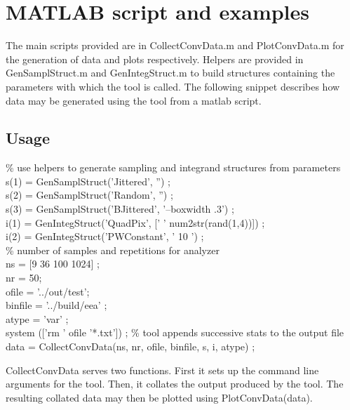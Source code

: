 \section{MATLAB script and examples}
\label{sec:matlab}
The main scripts provided are in CollectConvData.m and PlotConvData.m for the generation of data and plots respectively. Helpers are provided in GenSamplStruct.m  and GenIntegStruct.m to build structures containing the parameters with which the tool is called. The following snippet describes how data may be generated using the tool from a matlab script. 
\subsection{Usage}
\begin{tcolorbox}
 \% use helpers to generate sampling and integrand structures from parameters\\
 s(1) = GenSamplStruct('Jittered', '') ; \\
 s(2) = GenSamplStruct('Random', '') ; \\
 s(3) = GenSamplStruct('BJittered', '--boxwidth .3') ; \\
 i(1) = GenIntegStruct('QuadPix', [' ' num2str(rand(1,4))]) ; \\
 i(2) = GenIntegStruct('PWConstant', ' 10 ') ; \\
 \% number of samples and repetitions for analyzer \\
 ns = [9 36 100 1024] ;\\
 nr =  50;\\
 ofile = '../out/test';\\
 binfile = '../build/eea' ;\\
 atype = 'var' ;\\
 system (['rm ' ofile '*.txt']) ; \% tool appends successive stats to the output file \\
 data = CollectConvData(ns, nr, ofile, binfile, s, i, atype) ;
\end{tcolorbox}
CollectConvData serves two functions. First it sets up the command line arguments for the tool. Then, it collates the output produced by the tool. The resulting collated data may then be plotted using PlotConvData(data).


